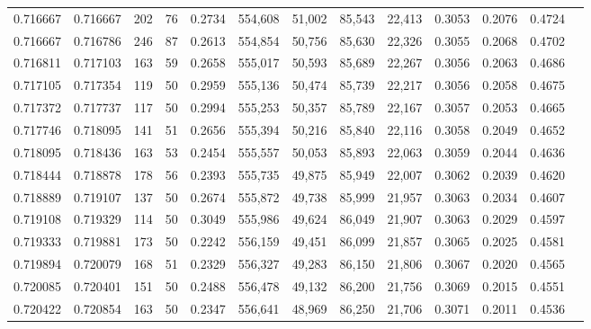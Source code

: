 \begin{tabular}{rrrrrrrrrrrrr}
0.716667 & 0.716667 &    202 &    76 &                                     0.2734 & 554,608 &  51,002 &  85,543 &  22,413 & 0.3053 & 0.2076 & 0.4724 \\
0.716667 & 0.716786 &    246 &    87 &                                     0.2613 & 554,854 &  50,756 &  85,630 &  22,326 & 0.3055 & 0.2068 & 0.4702 \\
0.716811 & 0.717103 &    163 &    59 &                                     0.2658 & 555,017 &  50,593 &  85,689 &  22,267 & 0.3056 & 0.2063 & 0.4686 \\
0.717105 & 0.717354 &    119 &    50 &                                     0.2959 & 555,136 &  50,474 &  85,739 &  22,217 & 0.3056 & 0.2058 & 0.4675 \\
0.717372 & 0.717737 &    117 &    50 &                                     0.2994 & 555,253 &  50,357 &  85,789 &  22,167 & 0.3057 & 0.2053 & 0.4665 \\
0.717746 & 0.718095 &    141 &    51 &                                     0.2656 & 555,394 &  50,216 &  85,840 &  22,116 & 0.3058 & 0.2049 & 0.4652 \\
0.718095 & 0.718436 &    163 &    53 &                                     0.2454 & 555,557 &  50,053 &  85,893 &  22,063 & 0.3059 & 0.2044 & 0.4636 \\
0.718444 & 0.718878 &    178 &    56 &                                     0.2393 & 555,735 &  49,875 &  85,949 &  22,007 & 0.3062 & 0.2039 & 0.4620 \\
0.718889 & 0.719107 &    137 &    50 &                                     0.2674 & 555,872 &  49,738 &  85,999 &  21,957 & 0.3063 & 0.2034 & 0.4607 \\
0.719108 & 0.719329 &    114 &    50 &                                     0.3049 & 555,986 &  49,624 &  86,049 &  21,907 & 0.3063 & 0.2029 & 0.4597 \\
0.719333 & 0.719881 &    173 &    50 &                                     0.2242 & 556,159 &  49,451 &  86,099 &  21,857 & 0.3065 & 0.2025 & 0.4581 \\
0.719894 & 0.720079 &    168 &    51 &                                     0.2329 & 556,327 &  49,283 &  86,150 &  21,806 & 0.3067 & 0.2020 & 0.4565 \\
0.720085 & 0.720401 &    151 &    50 &                                     0.2488 & 556,478 &  49,132 &  86,200 &  21,756 & 0.3069 & 0.2015 & 0.4551 \\
0.720422 & 0.720854 &    163 &    50 &                                     0.2347 & 556,641 &  48,969 &  86,250 &  21,706 & 0.3071 & 0.2011 & 0.4536 \\

\end{tabular}
